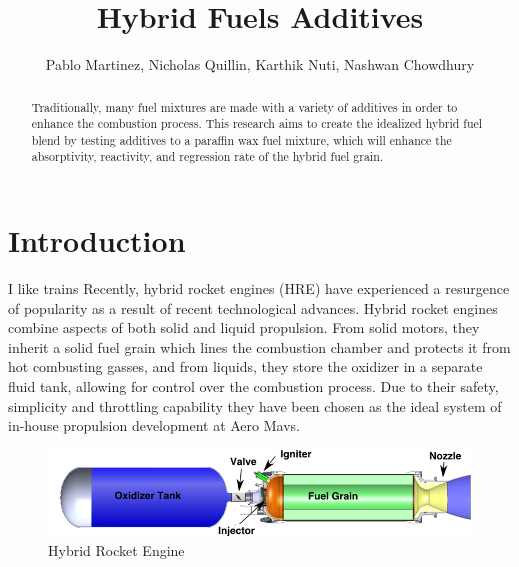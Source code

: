 \documentclass[letterpaper, 10 pt]{ieeeconf}
\title{\LARGE \bf Hybrid Fuels Additives}
\author{{Pablo Martinez, Nicholas Quillin, Karthik Nuti, Nashwan Chowdhury}}
\begin{document}
\maketitle
\thispagestyle{empty}
\pagestyle{empty}

\begin{abstract}
Traditionally, many fuel mixtures are made with a variety of additives in order to enhance the combustion process. This research aims to create the idealized hybrid fuel blend by testing additives to a paraffin wax fuel mixture, which will enhance the absorptivity, reactivity, and regression rate of the hybrid fuel grain.
\end{abstract}

\section{Introduction}
\label{sec:introduction}
I like trains
Recently, hybrid rocket engines (HRE) have experienced
a resurgence of popularity as a result of recent technological advances. Hybrid rocket engines combine aspects of both solid and liquid propulsion. From solid motors, they inherit a solid fuel grain which lines the combustion chamber and protects it from hot combusting gasses, and from liquids, they store the oxidizer in a separate fluid tank, allowing for control over the combustion process. Due to their safety, simplicity and throttling capability they have been chosen as the ideal system of in-house propulsion development at Aero Mavs.

\begin{figure}[h]
    \centering
    \includegraphics[width=1\linewidth]{Figures/hybridthingi.png}
    \caption{Hybrid Rocket Engine\cite{HybridImage}}
    \label{fig:placeholder1}
\end{figure}
\end{document}
